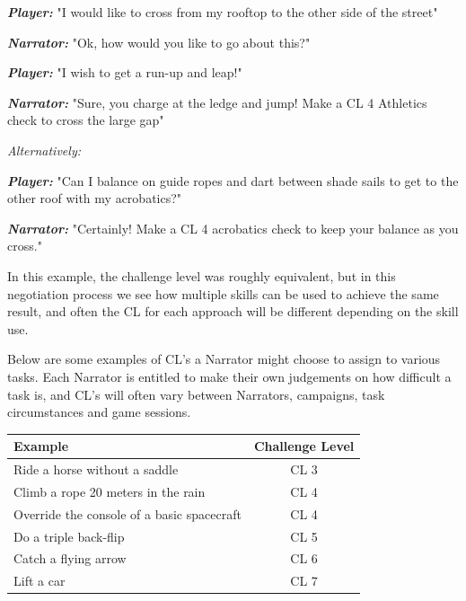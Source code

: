 \begin{displayquote}
    \textit{\textbf{Player:}} "I would like to cross from my rooftop to the other side of the street"

    \textit{\textbf{Narrator:}} "Ok, how would you like to go about this?"

    \textit{\textbf{Player:}} "I wish to get a run-up and leap!"

    \textit{\textbf{Narrator:}} "Sure, you charge at the ledge and jump! Make a CL 4 Athletics check to cross the large gap"
\end{displayquote}

\textit{Alternatively:}

\begin{displayquote}
    \textit{\textbf{Player:}} "Can I balance on guide ropes and dart between shade sails to get to the other roof with my acrobatics?"

    \textit{\textbf{Narrator:}} "Certainly! Make a CL 4 acrobatics check to keep your balance as you cross."
\end{displayquote}

In this example, the challenge level was roughly equivalent, but in this negotiation process we see how multiple skills can be used to achieve the same result, and often the CL for each approach will be different depending on the skill use.

Below are some examples of CL’s a Narrator might choose to assign to various tasks. Each Narrator is entitled to make their own judgements on how difficult a task is, and CL’s will often vary between Narrators, campaigns, task circumstances and game sessions.

\begin{center}
    \begin{xltabular}{0.7\textwidth}{|l|c|} 
        \hline 
        \textbf{Example} & \textbf{Challenge Level} \\ 
        \hline
        Ride a horse without a saddle & CL 3 \\
        Climb a rope 20 meters in the rain & CL 4 \\
        Override the console of a basic spacecraft & CL 4 \\
        Do a triple back-flip & CL 5 \\
        Catch a flying arrow & CL 6 \\
        Lift a car & CL 7 \\
        \hline
    \end{xltabular}
\end{center}

